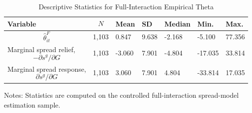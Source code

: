\begin{table}[H]\centering
\begin{threeparttable}
\caption{Descriptive Statistics for Full-Interaction Empirical Theta}
\label{tab:theta_descriptive_stats}
\scriptsize
\begin{tabularx}{\textwidth}{lYYYYYY}
\toprule
Variable & $$N$$ & Mean & SD & Median & Min. & Max. \\
\midrule
$$\widehat{\theta}^{F}_{it}$$ & 1,103 & 0.847 & 9.638 & -2.168 & -5.100 & 77.356 \\
Marginal spread relief, $$-\partial s^g/\partial G$$ & 1,103 & -3.060 & 7.901 & -4.804 & -17.035 & 33.814 \\
Marginal spread response, $$\partial s^g/\partial G$$ & 1,103 & 3.060 & 7.901 & 4.804 & -33.814 & 17.035 \\
\bottomrule
\end{tabularx}
\begin{tablenotes}[flushleft]\footnotesize
\item Notes: Statistics are computed on the controlled full-interaction spread-model estimation sample.
\end{tablenotes}
\end{threeparttable}
\end{table}
